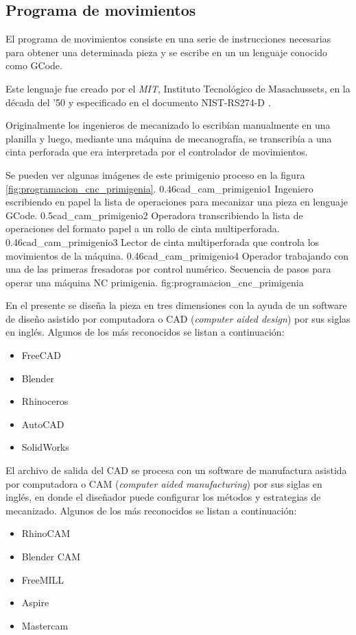 \subsection{Programa de movimientos}
   El programa de movimientos consiste en una serie de instrucciones necesarias para obtener una determinada pieza y se escribe en un un lenguaje conocido como GCode\citep{WEBSITE:gcode_wiki}.\par
   Este lenguaje fue creado por el \textit{MIT}, Instituto Tecnológico de Masachussets, en la década del '50 y especificado en el documento NIST-RS274-D \citep{rs274}.\par
Originalmente los ingenieros de mecanizado lo escribían manualmente en una planilla y luego, mediante una máquina de mecanografía, se transcribía a una cinta perforada que era interpretada por el controlador de movimientos.\par
Se pueden ver algunas imágenes de este primigenio proceso en la figura \ref{fig:programacion_cnc_primigenia}.
\subfigtwotwo
          {0.46}{cad_cam_primigenio1} {Ingeniero escribiendo en papel la lista de operaciones para mecanizar una pieza en lenguaje GCode.}
          {0.5}{cad_cam_primigenio2} {Operadora transcribiendo la lista de operaciones del formato papel a un rollo de cinta multiperforada.}
          {0.46}{cad_cam_primigenio3} {Lector de cinta multiperforada que controla los movimientos de la máquina.}
          {0.46}{cad_cam_primigenio4} {Operador trabajando con una de las primeras fresadoras por control numérico.}
          {Secuencia de pasos para operar una máquina NC primigenia.}
          {fig:programacion_cnc_primigenia}


          En el presente se diseña la pieza en tres dimensiones con la ayuda de un software de diseño asistido por computadora o CAD (\textit{computer aided design}) por sus siglas en inglés. Algunos de los más reconocidos se listan a continuación:
          \begin{itemize}
             \item{FreeCAD}
             \item{Blender}
             \item{Rhinoceros}
             \item{AutoCAD}
             \item{SolidWorks}
          \end{itemize}
   El archivo de salida del CAD se procesa con un software de manufactura asistida por computadora o CAM (\textit{computer aided manufacturing}) por sus siglas en inglés, en donde el diseñador puede configurar los métodos y estrategias de mecanizado. Algunos de los más reconocidos se listan a continuación:
          \begin{itemize}
             \item{RhinoCAM}
             \item{Blender CAM}
             \item{FreeMILL}
             \item{Aspire}
             \item{Mastercam}
          \end{itemize}

